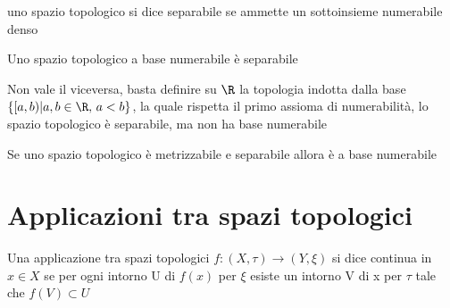 \documentclass[a4paper]{article}
\begin{document}
\begin{deff}
uno spazio topologico si dice separabile se ammette un sottoinsieme numerabile denso
\end{deff}

\begin{prop}
Uno spazio topologico a base numerabile è separabile
\end{prop}

\begin{oss}
Non vale il viceversa, basta definire su $\R$ la topologia indotta dalla base $\{ [a,b) | a,b \in \R , \, a < b \}$, la quale rispetta il primo assioma di numerabilità, lo spazio topologico è separabile, ma non ha base numerabile 
\end{oss}

\begin{prop}
	Se uno spazio topologico è metrizzabile e separabile allora è a base numerabile
\end{prop}

\section{Applicazioni tra spazi topologici}

\begin{deff}
Una applicazione tra spazi topologici $f:(X,\tau) \to (Y,\xi )$ si dice continua in $x \in X$ se per ogni intorno U di $f(x)$ per $\xi$ esiste un intorno V di x per $\tau$ tale che $f(V) \subset U $
\end{deff}
\end{document}
